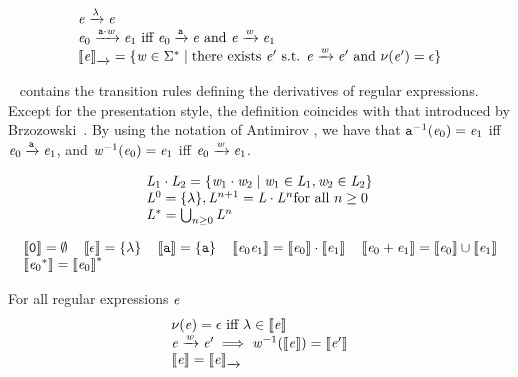 \begin{definition}
 \[
  \begin{array}{l}
   \re\der{\emptyWord}\re \\
   \re_0\der{\sym\strcatop\word}\re_1 \mbox{ iff } \re_0\der{\sym}\re \mbox{ and } \re\der{\word}\re_1
   \\
   \opSem{\re}{\der{}}=\{\word\in\wordUniv \mid \mbox{there exists } \re' \mbox{ s.t. } \re\der{\word}\re' \mbox{ and } \hasEps{\re'}=\eps\}
  \end{array}
 \]
\end{definition}

~ contains the transition rules defining the derivatives of regular expressions.
Except for the presentation style, the definition coincides with that introduced by Brzozowski~\cite{Brzozowski64}. By using the notation of Antimirov \cite{Antimirov96}, we have
that $\sym^{-1}(\re_0)=\re_1$ iff $\re_0\der{\sym}\re_1$, and $\word^{-1}(\re_0)=\re_1$ iff $\re_0\der{\word}\re_1$.


\begin{definition}
 \[
  \begin{array}{l}
   \lang_1\strcatop\lang_2=\{\word_1\strcatop\word_2\mid \word_1\in\lang_1,\word_2\in\lang_2\} \\
   \lang^0=\{\emptyWord\}, \lang^{n+1}=\lang\strcatop\lang^n \mbox{for all $n\geq 0$}          \\
   \starop{\lang} = \bigcup_{n\geq 0}\lang^n
  \end{array}
 \]
\end{definition}
\begin{definition}
 \[
  \begin{array}{l}
   \sem{\none}=\emptyset\quad \sem{\eps}=\{\emptyWord\} \quad \sem{\sym}=\{\sym\} \quad
   \sem{\re_0\catop\re_1}=\sem{\re_0}\strcatop\sem{\re_1} \quad \sem{\re_0\orop\re_1}=\sem{\re_0}\cup\sem{\re_1} \\ \sem{\starop{\re_0}}=\starop{\sem{\re_0}}
  \end{array}
 \]
\end{definition}

\begin{theorem}
 For all regular expressions $\re$
 \[
  \begin{array}{l}
   \hasEps{\re} = \eps \mbox{ iff } \emptyWord\in\sem{\re}      \\
   \re\der{\word}\re' \implies \word^{-1}(\sem{\re})=\sem{\re'} \\
   \sem{\re}=\opSem{\re}{\der{}}
  \end{array}
 \]
\end{theorem}


